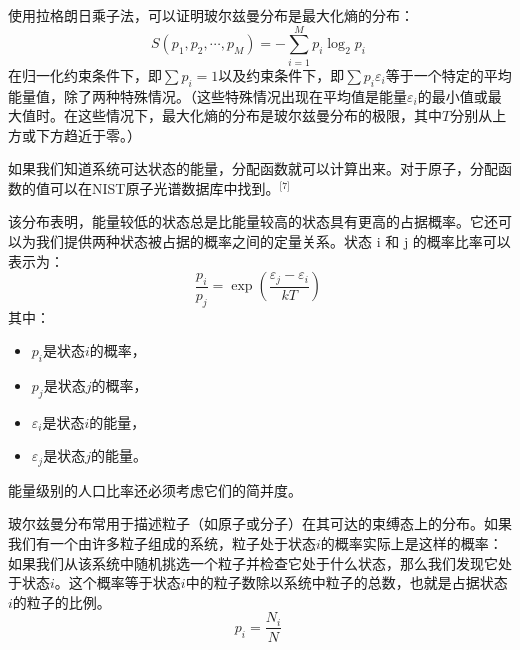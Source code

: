 使用拉格朗日乘子法，可以证明玻尔兹曼分布是最大化熵的分布：
\[
S(p_1, p_2, \cdots, p_M) = -\sum_{i=1}^{M} p_i \log_2 p_i~
\]
在归一化约束条件下，即\(\sum p_i = 1\)以及约束条件下，即\(\sum p_i \varepsilon_i\)等于一个特定的平均能量值，除了两种特殊情况。（这些特殊情况出现在平均值是能量\(\varepsilon_i\)的最小值或最大值时。在这些情况下，最大化熵的分布是玻尔兹曼分布的极限，其中\(T\)分别从上方或下方趋近于零。）

如果我们知道系统可达状态的能量，分配函数就可以计算出来。对于原子，分配函数的值可以在NIST原子光谱数据库中找到。\(^\text{[7]}\)

该分布表明，能量较低的状态总是比能量较高的状态具有更高的占据概率。它还可以为我们提供两种状态被占据的概率之间的定量关系。状态 i 和 j 的概率比率可以表示为：
\[
\frac{p_i}{p_j} = \exp \left( \frac{\varepsilon_j - \varepsilon_i}{kT} \right)~
\]
其中：
\begin{itemize}
\item \( p_i \)是状态\(i\)的概率，  
\item \( p_j \)是状态\(j\)的概率，  
\item \( \varepsilon_i \)是状态\(i\)的能量，  
\item \( \varepsilon_j \)是状态\(j\)的能量。
\end{itemize}
能量级别的人口比率还必须考虑它们的简并度。

玻尔兹曼分布常用于描述粒子（如原子或分子）在其可达的束缚态上的分布。如果我们有一个由许多粒子组成的系统，粒子处于状态\(i\)的概率实际上是这样的概率：如果我们从该系统中随机挑选一个粒子并检查它处于什么状态，那么我们发现它处于状态\(i\)。这个概率等于状态\(i\)中的粒子数除以系统中粒子的总数，也就是占据状态\(i\)的粒子的比例。
\[
p_i = \frac{N_i}{N}~
\]
